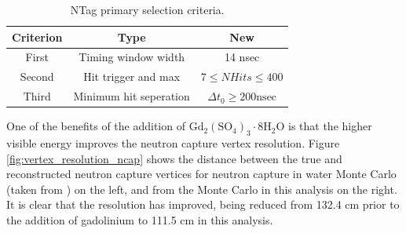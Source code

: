 \begin{table}
    \centering
    \begin{tabular}{||ccc||}
        \hline Criterion & Type & New \\
        \hline First & Timing window width & 14 nsec \\
        Second & Hit trigger and max & $7 \leq N H i t s \leq 400$ \\
        Third & Minimum hit seperation & $\Delta t_0 \geq 200 \mathrm{nsec}$ \\
        \hline
    \end{tabular}
    \caption{NTag primary selection criteria.}
    \label{table:new_selection_criteria}
\end{table}

 One of the benefits of the addition of $\mathrm{Gd}_{2}\left(\mathrm{SO}_{4}\right)_{3} \cdot 8 \mathrm{H}_{2} \mathrm{O}$ is that the higher visible energy improves the neutron capture vertex resolution. Figure \ref{fig:vertex_resolution_ncap} shows the distance between the true and reconstructed neutron capture vertices for neutron capture in water Monte Carlo (taken from \cite{akutsu_thesis}) on the left, and from the Monte Carlo in this analysis on the right. It is clear that the resolution has improved, being reduced from 132.4 cm prior to the addition of gadolinium to 111.5 cm in this analysis.


